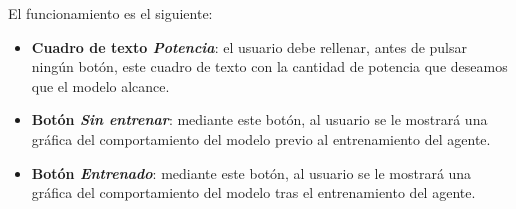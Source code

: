El funcionamiento es el siguiente:
\begin{itemize}
    \item \textbf{Cuadro de texto \textit{Potencia}}: el usuario debe rellenar, antes de pulsar ningún botón, este cuadro de texto con la cantidad de potencia que deseamos que el modelo alcance.
    \item \textbf{Botón \textit{Sin entrenar}}: mediante este botón, al usuario se le mostrará una gráfica del comportamiento del modelo previo al entrenamiento del agente.
    \item \textbf{Botón \textit{Entrenado}}: mediante este botón, al usuario se le mostrará una gráfica del comportamiento del modelo tras el entrenamiento del agente.
\end{itemize}